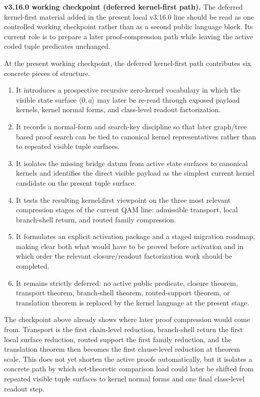\noindent\textbf{v3.16.0 working checkpoint (deferred kernel-first path).} The deferred kernel-first material added in the present local v3.16.0 line should be read as one controlled working checkpoint rather than as a second public language block. Its current role is to prepare a later proof-compression path while leaving the active coded tuple predicates unchanged.

\begin{remark}\label{rem:qam-zero-kernel-checkpoint}
At the present working checkpoint, the deferred kernel-first path contributes six concrete pieces of structure.
\begin{enumerate}[leftmargin=2em]
  \item It introduces a prospective recursive zero-kernel vocabulary in which the visible state surface $\langle 0,a\rangle$ may later be re-read through exposed payload kernels, kernel normal forms, and class-level readout factorization.
  \item It records a normal-form and search-key discipline so that later graph/tree based proof search can be tied to canonical kernel representatives rather than to repeated visible tuple surfaces.
  \item It isolates the missing bridge datum from active state surfaces to canonical kernels and identifies the direct visible payload as the simplest current kernel candidate on the present tuple surface.
  \item It tests the resulting kernel-first viewpoint on the three most relevant compression stages of the current QAM line: admissible transport, local branch-shell return, and routed family compression.
  \item It formulates an explicit activation package and a staged migration roadmap, making clear both what would have to be proved before activation and in which order the relevant closure/readout factorization work should be completed.
  \item It remains strictly deferred: no active public predicate, closure theorem, transport theorem, branch-shell theorem, routed-support theorem, or translation theorem is replaced by the kernel language at the present stage.
\end{enumerate}
\end{remark}

\begin{remark}\label{rem:qam-zero-kernel-checkpoint-why}
The checkpoint above already shows where later proof compression would come from. Transport is the first chain-level reduction, branch-shell return the first local surface reduction, routed support the first family reduction, and the translation theorem then becomes the first clause-level reduction at theorem scale. This does not yet shorten the active proofs automatically, but it isolates a concrete path by which set-theoretic comparison load could later be shifted from repeated visible tuple surfaces to kernel normal forms and one final class-level readout step.
\end{remark}

